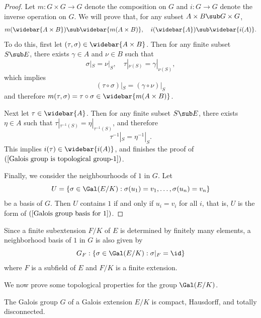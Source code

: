 \begin{proof}
Let $m:G\times G\to G$ denote the composition on $G$ and $i:G\to G$ denote the inverse operation on $G$. We will prove that, for any subset $A\times B\sub G\times G$,
\begin{align}\label{Galois group is topological group-1}
m(\widebar{A\times B})\sub\widebar{m(A\times B)},\quad i(\widebar{A})\sub\widebar{i(A)}.
\end{align}
To do this, first let $(\tau,\sigma)\in\widebar{A\times B}$. Then for any finite subset $S\sub E$, there exists $\gamma\in A$ and $\nu\in B$ such that
\[\sigma|_{S}=\nu|_{S},\quad \tau|_{\nu(S)}=\gamma|_{\nu(S)},\]
which implies
\[(\tau\circ\sigma)|_{S}=(\gamma\circ\nu)|_{S}\]
and therefore $m(\tau,\sigma)=\tau\circ\sigma\in\widebar{m(A\times B)}$.\par
Next let $\tau\in\widebar{A}$. Then for any finite subset $S\sub E$, there exists $\eta\in A$ such that $\tau|_{\tau^{-1}(S)}=\eta|_{\tau^{-1}(S)}$, and therefore
\[\tau^{-1}|_{S}=\eta^{-1}|_{S}.\]
This implies $i(\tau)\in\widebar{i(A)}$, and finishes the proof of $(\ref{Galois group is topological group-1})$.\par
Finally, we consider the neighbourhoods of $1$ in $G$. Let
\[U=\{\sigma\in\Gal(E/K):\sigma(u_1)=v_1,\dots,\sigma(u_n)=v_n\}\]
be a basis of $G$. Then $U$ contains $1$ if and only if $u_i=v_i$ for all $i$, that is, $U$ is the form of $(\ref{Galois group basis for 1})$.
\end{proof}
\begin{remark}
Since a finite subextension $F/K$ of $E$ is determined by finitely many elements, a neighborhood basis of $1$ in $G$ is also given by
\[G_F:\{\sigma\in\Gal(E/K):\sigma|_F=\id\}\]
where $F$ is a subfield of $E$ and $F/K$ is a finite extension.
\end{remark}
We now prove some topological properties for the group $\Gal(E/K)$. 
\begin{proposition}
The Galois group $G$ of a Galois extension $E/K$ is compact, Hausdorff, and totally disconnected.
\end{proposition}
